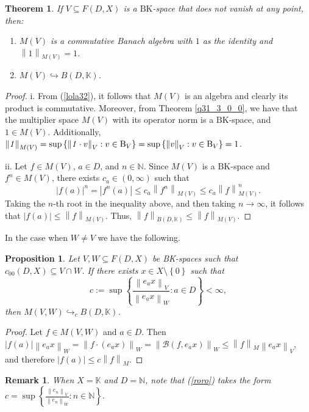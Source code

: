 \documentclass[14pt, a4paper]{article}  %
\providecommand{\llave}[1]{\left\lbrace #1\right\rbrace }
\providecommand{\pare}[1]{\left( #1\right) }
\providecommand{\norm}[1]{\left\lVert#1\right\rVert}
\providecommand{\abs}[1]{\left\lvert#1\right\rvert}
\newcommand{\K}{\mathbb{K}}
\newcommand{\N}{\mathbb{N}}
\newcommand{\BK}{\text{BK}}
\newcommand{\BB}{\mathscr{B}}
\newcommand{\B}{\textup{B}}
\newtheorem{proposition}{Proposition}[section]
\newtheorem{theorem}{Theorem}[section]
\newtheorem{remark}{Remark}[section]
\begin{document}
\begin{theorem}\label{lola23} \label{piz25_2} \label{lola98_0} 
	If $V\subseteq F\pare{D,X}$ is a $\BK$-space that does not vanish at any point, then:
	\begin{enumerate}
		\item[i.]   $M\pare{V}$ is a commutative Banach algebra with $\mathit{1}$ as the identity and $\norm{\mathit{1}}_{M\pare{V}}=1$. 
		
		\item[ii.] $M\pare{V}\hookrightarrow B\pare{D,\K}$.
	\end{enumerate} 
\end{theorem}  
\begin{proof}
	i. From (\ref{lola32}), it follows that $M\pare{V}$ is an algebra and clearly its product is commutative. Moreover, from Theorem \ref{q31_3_0_0}, we have that the multiplier space $M\pare{V}$ with its operator norm is a $\BK$-space, and $\mathit{1} \in M\pare{V}$. Additionally, $\norm{\mathit{1}}_{M\pare{V}} = \sup \llave{\norm{\mathit{1}\cdot v}_{V}:v \in \B_{V}} = \sup \llave{\norm{ v}_{V}:v \in \B_{V}} = 1$.
	
	ii. Let $f \in M\pare{V}$, $a \in D$, and $n \in \N$. Since $M\pare{V}$ is a $\BK$-space and $f^n \in M\pare{V}$, there exists $c_a \in \pare{0,\infty}$ such that  
\begin{equation}
	\abs{f\pare{a}}^n = \abs{f^n\pare{a}} \leq c_a \norm{f^n}_{M\pare{V}} \leq c_a \norm{f}_{M\pare{V}}^n.
\end{equation}
	Taking the $n$-th root in the inequality above, and then taking $n \to \infty$, it follows that $\abs{f\pare{a}} \leq \norm{f}_{M\pare{V}}$. Thus, $\norm{f}_{B\pare{D,\K}} \leq \norm{f}_{M\pare{V}}$.
\end{proof}

In the case when $W \neq V$ we have the following.

\begin{proposition}
	Let $V, W \subseteq F\pare{D,X}$ be BK-spaces such that $c_{00} (D,X) \subseteq  V \cap W$. If there exists $x\in X\setminus\llave{0}$ such that
\begin{equation}\label{roro}
	c:=\sup\llave{\frac{\norm{e_{a}x}_{V}}{\norm{e_{a}x}_{W}}:a\in D}<\infty,
\end{equation}
	then   $M(V,W)\hookrightarrow_{c}B\pare{D,\K}$.
\end{proposition}

\begin{proof} 
	Let $f\in M\pare{V,W}$ and $a\in D$. Then
	$
	\abs{f\pare{a}}\norm{e_{a}x}_{W}
	=
	\norm{f\cdot\pare{e_{a}x}}_{W}
	=
	\norm{\BB\pare{f,e_{a}x}}_{W}
	\leq
	\norm{f}_{M}\norm{e_{a}x}_{V},
	$
	and therefore
	$
	\abs{f\pare{a}}\leq c\norm{f}_{M}.
	$
\end{proof}
\begin{remark}
When $X = \K$ and $D = \N$, note that (\ref{roro}) takes the form
$
c=\sup\llave{\frac{\norm{e_{n}}_{V}}{\norm{e_{n}}_{W}}:n\in \N}.
$
\end{remark}
\end{document}
